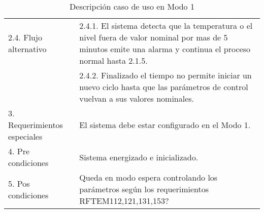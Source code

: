\begin{table}[h!]
\begin{flushleft}
\begin{tabular}{|m{3cm}|m{11cm}|}
\multicolumn{ 1}{|l|}{2.4. Flujo alternativo } & 2.4.1. El sistema detecta que la temperatura o el nivel fuera de valor nominal por mas de 5 minutos emite una alarma y continua el proceso normal hasta 2.1.5.\\ \cline{ 2- 2}
\multicolumn{ 1}{|l|}{} & 2.4.2.  Finalizado el tiempo no permite iniciar un nuevo ciclo hasta que las parámetros de control vuelvan a sus valores nominales.  \\ \hline
3. Requerimientos especiales & El sistema debe estar configurado en el Modo 1. \\ \hline
4. Pre condiciones  &  Sistema energizado e inicializado.   \\ \hline
5. Pos condiciones &  Queda en modo espera controlando los parámetros según los requerimientos RFTEM112,121,131,153? \\ \hline

\end{tabular}
\end{flushleft}
\caption{Descripción caso de uso en Modo 1}
\label{caso_uso_func_1}
\end{table}


